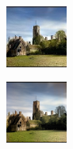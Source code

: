 \begin{figure}[t]
\begin{subfigure}[b]{0.1\textwidth}
	\end{subfigure}
	\hfill
	\begin{subfigure}[b]{0.1\textwidth}
		\includegraphics[width=2cm]{chr - imgnet2.jpeg}
	\end{subfigure}
	\hfill
	\begin{subfigure}[b]{0.1\textwidth}
		\includegraphics[width=2cm]{su - imgnet.png}
	\end{subfigure}


\end{figure}
